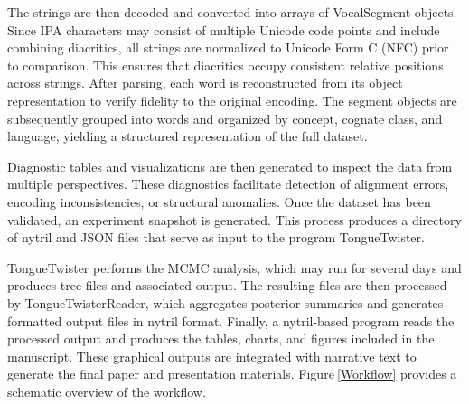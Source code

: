 \documentclass[numsec,webpdf,modern,large,namedate]{oup-authoring-template}
\begin{document}
The strings are then decoded and converted into arrays of VocalSegment objects. Since IPA characters may consist of multiple Unicode code points and include combining diacritics, all strings are normalized to Unicode Form C (NFC) prior to comparison. This ensures that diacritics occupy consistent relative positions across strings. After parsing, each word is reconstructed from its object representation to verify fidelity to the original encoding. The segment objects are subsequently grouped into words and organized by concept, cognate class, and language, yielding a structured representation of the full dataset. 

Diagnostic tables and visualizations are then generated to inspect the data from multiple perspectives. These diagnostics facilitate detection of alignment errors, encoding inconsistencies, or structural anomalies. Once the dataset has been validated, an experiment snapshot is generated. This process produces a directory of nytril and JSON files that serve as input to the program TongueTwister. 

TongueTwister performs the MCMC analysis, which may run for several days and produces tree files and associated output. The resulting files are then processed by TongueTwisterReader, which aggregates posterior summaries and generates formatted output files in nytril format. Finally, a nytril-based program reads the processed output and produces the tables, charts, and figures included in the manuscript. These graphical outputs are integrated with narrative text to generate the final paper and presentation materials. Figure$~$\ref{Workflow} provides a schematic overview of the workflow. 




\end{document}
